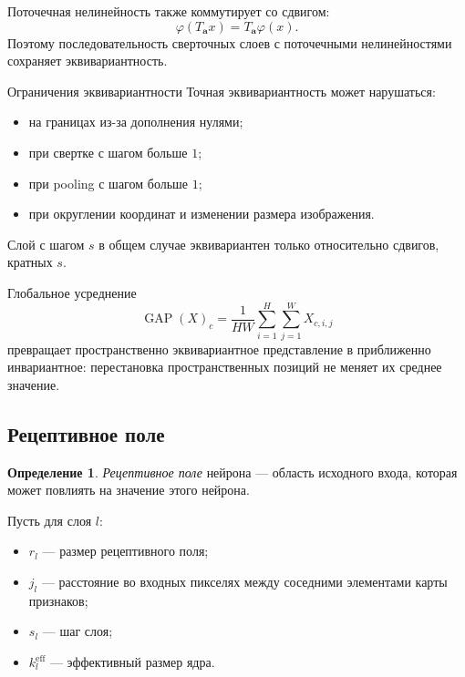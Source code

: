 \documentclass[12pt,a4paper]{article}
\numberwithin{equation}{section}
\theoremstyle{definition}
\newtheorem{definition}[theorem]{Определение}
\theoremstyle{remark}
\begin{document}
Поточечная нелинейность также коммутирует со сдвигом:
\[
    \varphi(T_{\bm{a}}x)
    =
    T_{\bm{a}}\varphi(x).
\]
Поэтому последовательность сверточных слоев с поточечными
нелинейностями сохраняет эквивариантность.

\begin{importantbox}{Ограничения эквивариантности}
Точная эквивариантность может нарушаться:

\begin{itemize}
    \item на границах из-за дополнения нулями;
    \item при свертке с шагом больше \(1\);
    \item при pooling с шагом больше \(1\);
    \item при округлении координат и изменении размера изображения.
\end{itemize}

Слой с шагом \(s\) в общем случае эквивариантен только относительно
сдвигов, кратных \(s\).
\end{importantbox}

Глобальное усреднение
\[
    \operatorname{GAP}(X)_c
    =
    \frac{1}{HW}
    \sum_{i=1}^{H}\sum_{j=1}^{W}X_{c,i,j}
\]
превращает пространственно эквивариантное представление в
приближенно инвариантное: перестановка пространственных позиций не
меняет их среднее значение.

\subsection{Рецептивное поле}

\begin{definition}
\emph{Рецептивное поле} нейрона --- область исходного входа, которая
может повлиять на значение этого нейрона.
\end{definition}

Пусть для слоя \(l\):

\begin{itemize}
    \item \(r_l\) --- размер рецептивного поля;
    \item \(j_l\) --- расстояние во входных пикселях между соседними
    элементами карты признаков;
    \item \(s_l\) --- шаг слоя;
    \item \(k_l^{\mathrm{eff}}\) --- эффективный размер ядра.
\end{itemize}
\end{document}
